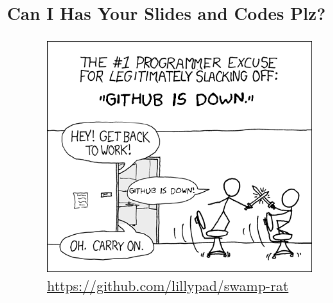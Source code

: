 \documentclass[aspectratio=169]{beamer}
\begin{document}
\begin{frame}
  \frametitle{Can I Has Your Slides and Codes Plz?}
  \begin{center}
    \begin{figure}
      \includegraphics[width=7cm,keepaspectratio]{git_meme}
      \caption{\href{https://github.com/lillypad/swamp-rat}{https://github.com/lillypad/swamp-rat}}
    \end{figure}
  \end{center}
\end{frame}
\end{document}
